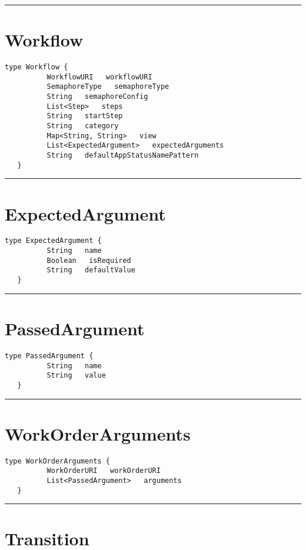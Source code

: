 \rule{12cm}{2pt}
\section{Workflow}
\label{type:Workflow}

\begin{lstlisting}[style=nonumbers]
   type Workflow {
          WorkflowURI   workflowURI
          SemaphoreType   semaphoreType
          String   semaphoreConfig
          List<Step>   steps
          String   startStep
          String   category
          Map<String, String>   view
          List<ExpectedArgument>   expectedArguments
          String   defaultAppStatusNamePattern
   }
\end{lstlisting}

\rule{12cm}{2pt}
\section{ExpectedArgument}
\label{type:ExpectedArgument}

\begin{lstlisting}[style=nonumbers]
   type ExpectedArgument {
          String   name
          Boolean   isRequired
          String   defaultValue
   }
\end{lstlisting}

\rule{12cm}{2pt}
\section{PassedArgument}
\label{type:PassedArgument}

\begin{lstlisting}[style=nonumbers]
   type PassedArgument {
          String   name
          String   value
   }
\end{lstlisting}

\rule{12cm}{2pt}
\section{WorkOrderArguments}
\label{type:WorkOrderArguments}

\begin{lstlisting}[style=nonumbers]
   type WorkOrderArguments {
          WorkOrderURI   workOrderURI
          List<PassedArgument>   arguments
   }
\end{lstlisting}

\rule{12cm}{2pt}
\section{Transition}
\label{type:Transition}

